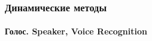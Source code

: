 \begin{frame}[allowframebreaks]
\frametitle{Динамические методы}
\framesubtitle{Голос. Speaker, Voice Recognition}

\begin{figure}
    \begin{center}
    \end{center}
\end{figure} 


\end{frame}
